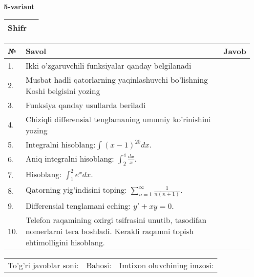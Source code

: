 \documentclass{article}
\begin{document}
  \egroup
  
  \newpage
  
  
  \textbf{5-variant}\\
  
  \bgroup
  \def\arraystretch{1.6} %
  
  \begin{tabular}{|m{5.7cm}|m{9.5cm}|}
  \hline
  Shifr & \\
  \hline
  \end{tabular}
  
  \vspace{1cm}
  
  \begin{tabular}{|m{0.7cm}|m{10cm}|m{4cm}|}
  \hline
  № & Savol & Javob \\
  \hline
  1. & Ikki o'zgaruvchili funksiyalar qanday belgilanadi &  \\
  \hline
  2. & Musbat hadli qatorlarning yaqinlashuvchi bo'lishning Koshi belgisini yozing &  \\
  \hline
  3. & Funksiya qanday usullarda beriladi &  \\
  \hline
  4. & Chiziqli differensial tenglamaning umumiy ko'rinishini yozing &  \\
  \hline
  5. & Integralni hisoblang:\(\int {(x - 1)^{20}}dx\). &  \\
  \hline
  6. & Aniq integralni hisoblang: \(\int_{2}^{4}\frac{dx}{x}\). &  \\
  \hline
  7. & Hisoblang: \(\int_{1}^{2}{e^{x}dx}\). &  \\
  \hline
  8. & Qatorning yig'indisini toping: \(\sum_{n = 1}^{\infty}\frac{1}{n(n + 1)}\). &  \\
  \hline
  9. & Differensial tenglamani eching: \(y' + xy = 0\). &  \\
  \hline
  10. & Telefon raqamining oxirgi tsifrasini unutib, tasodifan nomerlarni tera boshladi. Kerakli raqamni topish ehtimolligini hisoblang. &  \\
  \hline
  \end{tabular}
  
  \vspace{1cm}
  
  \begin{tabular}{lll}
  To'g'ri javoblar soni: \underline{\hspace{1.5cm}} & 
  Bahosi: \underline{\hspace{1.5cm}} & 
  Imtixon oluvchining imzosi: \underline{\hspace{2cm}} \\
  \end{tabular}
  
\end{document}
